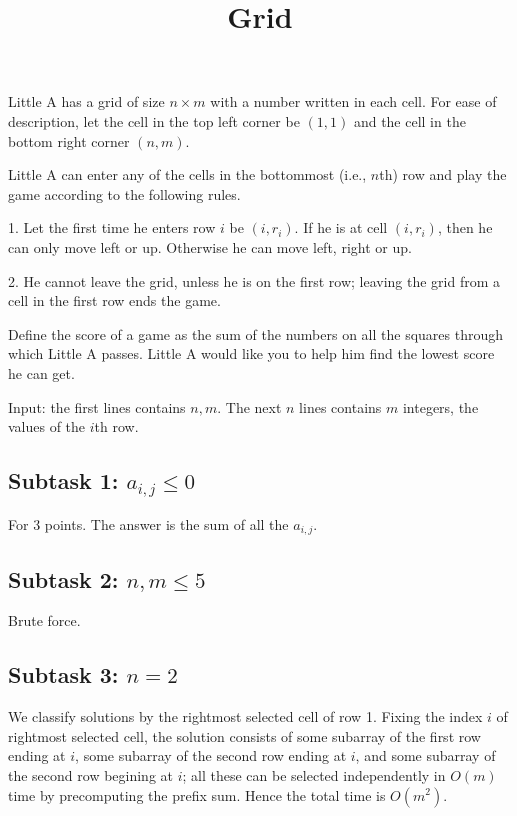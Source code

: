 \documentclass{article}
\title{Grid}
\date{}
\begin{document}
\maketitle

Little A has a grid of size $n \times m$ with a number written in each cell. For ease of description, let the cell in the top left corner be $(1,1)$ and the cell in the bottom right corner $(n,m)$.

Little A can enter any of the cells in the bottommost (i.e., $n$th) row and play the game according to the following rules.

1. Let the first time he enters row $i$ be $(i, r_i)$. If he is at cell $(i, r_i)$, then he can only move left or up. Otherwise he can move left, right or up.

2. He cannot leave the grid, unless he is on the first row; leaving the grid from a cell in the first row ends the game.

Define the score of a game as the sum of the numbers on all the squares through which Little A passes. Little A would like you to help him find the lowest score he can get.

Input: the first lines contains $n, m$. The next $n$ lines contains $m$ integers, the values of the $i$th row.


\subsection*{Subtask 1: $a_{i,j} \le 0$}

For 3 points. The answer is the sum of all the $a_{i,j}$.

\subsection*{Subtask 2: $n, m \le 5$}

Brute force.

\subsection*{Subtask 3: $n = 2$}

We classify solutions by the rightmost selected cell of row 1. Fixing the index $i$ of rightmost selected cell, the solution consists of some subarray of the first row ending at $i$, some subarray of the second row ending at $i$, and some subarray of the second row begining at $i$; all these can be selected independently in $O(m)$ time by precomputing the prefix sum. Hence the total time is $O(m^2)$.
\end{document}
